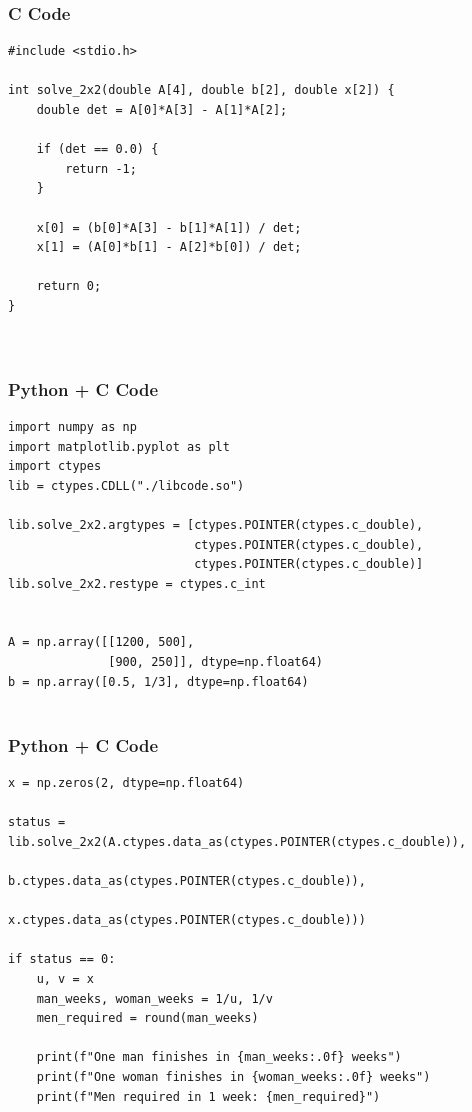 \documentclass{beamer}
\begin{document}
\begin{frame}[fragile]
    \frametitle{C Code}
    \begin{lstlisting}
#include <stdio.h>

int solve_2x2(double A[4], double b[2], double x[2]) {
    double det = A[0]*A[3] - A[1]*A[2]; 

    if (det == 0.0) {
        return -1; 
    }

    x[0] = (b[0]*A[3] - b[1]*A[1]) / det;
    x[1] = (A[0]*b[1] - A[2]*b[0]) / det;

    return 0; 
}



    \end{lstlisting}
\end{frame}
\begin{frame}[fragile]
    \frametitle{Python + C Code}
    \begin{lstlisting}
import numpy as np
import matplotlib.pyplot as plt
import ctypes
lib = ctypes.CDLL("./libcode.so")

lib.solve_2x2.argtypes = [ctypes.POINTER(ctypes.c_double),
                          ctypes.POINTER(ctypes.c_double),
                          ctypes.POINTER(ctypes.c_double)]
lib.solve_2x2.restype = ctypes.c_int


A = np.array([[1200, 500],
              [900, 250]], dtype=np.float64)
b = np.array([0.5, 1/3], dtype=np.float64)


    \end{lstlisting}
\end{frame}
\begin{frame}[fragile]
    \frametitle{Python + C Code}
    \begin{lstlisting}
x = np.zeros(2, dtype=np.float64)

status = lib.solve_2x2(A.ctypes.data_as(ctypes.POINTER(ctypes.c_double)),
                       b.ctypes.data_as(ctypes.POINTER(ctypes.c_double)),
                       x.ctypes.data_as(ctypes.POINTER(ctypes.c_double)))

if status == 0:
    u, v = x
    man_weeks, woman_weeks = 1/u, 1/v
    men_required = round(man_weeks)

    print(f"One man finishes in {man_weeks:.0f} weeks")
    print(f"One woman finishes in {woman_weeks:.0f} weeks")
    print(f"Men required in 1 week: {men_required}")




    \end{lstlisting}
\end{frame}
\end{document}
